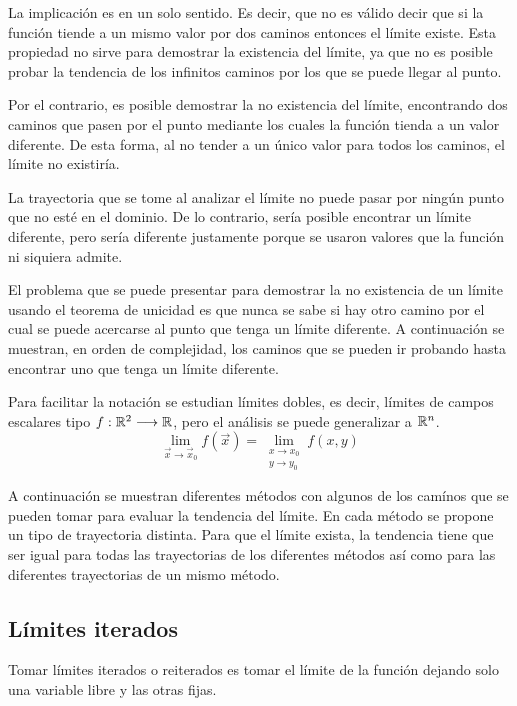 La implicación es en un solo sentido.
Es decir, que no es válido decir que si la función tiende a un mismo valor por dos caminos entonces el límite existe.
Esta propiedad no sirve para demostrar la existencia del límite, ya que no es posible probar la tendencia de los infinitos caminos por los que se puede llegar al punto.

Por el contrario, es posible demostrar la no existencia del límite, encontrando dos caminos que pasen por el punto mediante los cuales la función tienda a un valor diferente.
De esta forma, al no tender a un único valor para todos los caminos, el límite no existiría.

La trayectoria que se tome al analizar el límite no puede pasar por ningún punto que no esté en el dominio.
De lo contrario, sería posible encontrar un límite diferente, pero sería diferente justamente porque se usaron valores que la función ni siquiera admite.

El problema que se puede presentar para demostrar la no existencia de un límite usando el teorema de unicidad es que nunca se sabe si hay otro camino por el cual se puede acercarse al punto que tenga un límite diferente.
A continuación se muestran, en orden de complejidad, los caminos que se pueden ir probando hasta encontrar uno que tenga un límite diferente.

Para facilitar la notación se estudian límites dobles, es decir, límites de campos escalares tipo $f:\mathbb{R}^2 \longrightarrow \mathbb{R}$, pero el análisis se puede generalizar a $\mathbb{R}^n$.
\begin{equation*}
    \lim_{\Vec{x} \to \Vec{x}_0} f(\Vec{x}) = \lim_{\substack{x \to x_0\\y \to y_0}} f(x,y)
\end{equation*}

A continuación se muestran diferentes métodos con algunos de los camínos que se pueden tomar para evaluar la tendencia del límite.
En cada método se propone un tipo de trayectoria distinta.
Para que el límite exista, la tendencia tiene que ser igual para todas las trayectorias de los diferentes métodos así como para las diferentes trayectorias de un mismo método.


\subsection{Límites iterados}

Tomar límites iterados o reiterados es tomar el límite de la función dejando solo una variable libre y las otras fijas.

